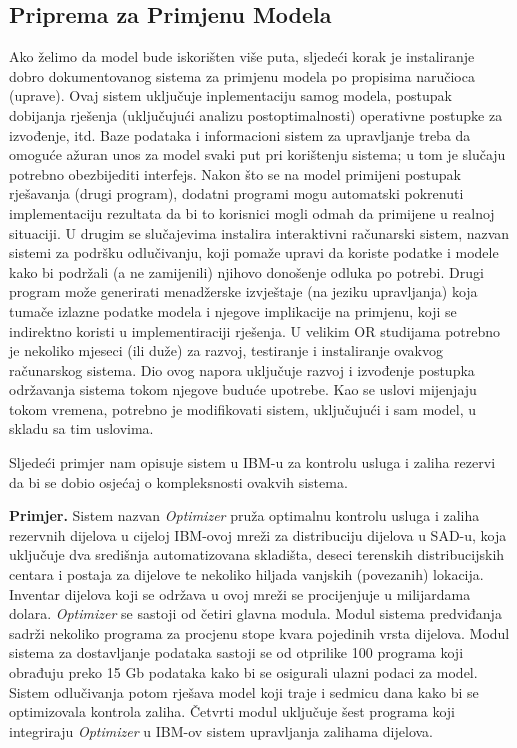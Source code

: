 \documentclass[a4paper, utf8, 11pt, colorlinks]{article}
\begin{document}
 \subsection{Priprema za Primjenu Modela}
 Ako želimo da model bude iskorišten više puta, sljedeći  korak je instaliranje dobro dokumentovanog sistema za primjenu modela po propisima naručioca (uprave). Ovaj sistem uključuje inplementaciju samog modela, postupak dobijanja rješenja (uključujući analizu postoptimalnosti) operativne postupke za izvođenje, itd. %
 Baze podataka i informacioni sistem za upravljanje treba da omoguće ažuran unos za model svaki put pri korištenju sistema; u tom je slučaju potrebno obezbijediti interfejs. Nakon što se na model primijeni postupak rješavanja (drugi program), dodatni  programi mogu automatski pokrenuti implementaciju rezultata da bi to korisnici mogli odmah da primijene u realnoj situaciji. U drugim se slučajevima instalira interaktivni računarski sistem,  nazvan sistemi za podršku odlučivanju, koji pomaže upravi da koriste podatke i modele kako bi podržali (a ne zamijenili) njihovo donošenje odluka po potrebi. Drugi program može generirati menadžerske izvještaje (na jeziku upravljanja) koja tumače izlazne podatke modela i njegove implikacije na primjenu, koji se indirektno koristi u implementiraciji rješenja.  U velikim OR studijama potrebno je nekoliko mjeseci (ili duže) za razvoj, testiranje i instaliranje ovakvog računarskog sistema. Dio ovog napora uključuje razvoj i izvođenje postupka održavanja sistema  tokom njegove buduće upotrebe. Kao se uslovi mijenjaju tokom vremena, potrebno je  modifikovati sistem, uključujući i sam model, u skladu sa tim uslovima.  

Sljedeći primjer nam opisuje sistem u IBM-u za kontrolu usluga i zaliha rezervi da bi se dobio osjećaj o kompleksnosti ovakvih sistema.  

\textbf{Primjer.}
 Sistem nazvan \emph{Optimizer} pruža optimalnu kontrolu usluga i zaliha rezervnih dijelova u cijeloj IBM-ovoj mreži za distribuciju dijelova u SAD-u, koja uključuje dva središnja
automatizovana skladišta, deseci terenskih distribucijskih centara i postaja za dijelove te nekoliko hiljada vanjskih (povezanih) lokacija. Inventar dijelova koji se održava u ovoj mreži se procijenjuje u milijardama dolara. \emph{Optimizer} se sastoji od četiri glavna modula. Modul sistema predviđanja sadrži nekoliko programa za procjenu stope kvara pojedinih vrsta dijelova. Modul sistema za dostavljanje podataka sastoji se od otprilike 100 programa koji    obrađuju
preko 15 Gb podataka kako bi se osigurali ulazni podaci za model. Sistem odlučivanja potom rješava model koji traje i  sedmicu dana kako bi se optimizovala kontrola zaliha. Četvrti modul uključuje šest programa koji integriraju \emph{Optimizer} u IBM-ov sistem upravljanja zalihama dijelova. %
\end{document}
